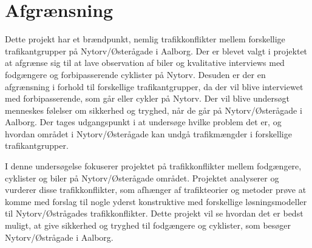 \chapter{Afgrænsning}
\label{chap:Afgrænsning}




Dette projekt har et brændpunkt, nemlig trafikkonflikter mellem forskellige trafikantgrupper på Nytorv/Østerågade i Aalborg. Der er blevet valgt i projektet at afgrænse sig til at lave observation af biler og kvalitative interviews med fodgængere og forbipasserende cyklister på Nytorv. Desuden er der en afgrænsning i forhold til forskellige trafikantgrupper, da der vil blive interviewet med forbipasserende, som går eller cykler på Nytorv. Der vil blive undersøgt menneskes følelser om sikkerhed og tryghed, når de går på Nytorv/Østerågade i Aalborg. Der tages udgangspunkt i at undersøge hvilke problem det er, og hvordan området i Nytorv/Østerågade kan undgå trafikmængder i forskellige trafikantgrupper.



I denne undersøgelse fokuserer projektet på trafikkonflikter mellem fodgængere, cyklister og biler på Nytorv/Østerågade området. Projektet analyserer og vurderer disse trafikkonflikter, som afhænger af trafikteorier og metoder prøve at komme med forslag til nogle yderst konstruktive med forskellige løsningsmodeller til Nytorv/Østrågades trafikkonflikter.  Dette projekt vil se hvordan det er bedst muligt, at give sikkerhed og tryghed til fodgængere og cyklister, som besøger Nytorv/Østrågade i Aalborg.